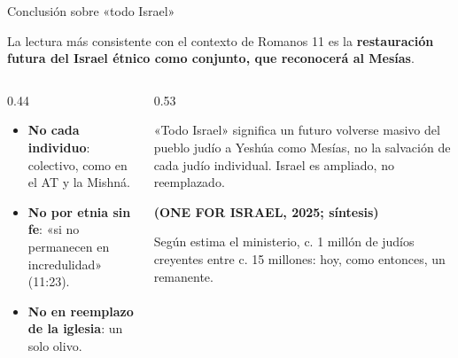 \documentclass[hyperref={bookmarks=false},aspectratio=169]{beamer}
\newcommand{\fuente}[1]{\par\hfill{\upshape\bfseries\footnotesize\textcolor{ladrillo}{#1}}}
\begin{document}
\begin{frame}{Conclusión sobre «todo Israel»}
\begin{tcolorbox}[colback=piedra,colframe=ladrillo,boxrule=1pt,arc=3pt,fontupper=\small]
La lectura más consistente con el contexto de Romanos 11 es la \textbf{restauración futura del Israel étnico como conjunto, que reconocerá al Mesías}.
\end{tcolorbox}
\begin{columns}[T,onlytextwidth]
\begin{column}{0.44\textwidth}\small
\begin{itemize}
\item \textbf{No cada individuo}: colectivo, como en el AT y la Mishná.
\item \textbf{No por etnia sin fe}: «si no permanecen en incredulidad» (11:23).
\item \textbf{No en reemplazo de la iglesia}: un solo olivo.
\end{itemize}
\end{column}
\begin{column}{0.53\textwidth}
\begin{cita}[fontupper=\scriptsize\itshape]«Todo Israel» significa un futuro volverse masivo del pueblo judío a Yeshúa como Mesías, no la salvación de cada judío individual. Israel es ampliado, no reemplazado.\fuente{(ONE FOR ISRAEL, 2025; síntesis)}\end{cita}
\scriptsize Según estima el ministerio, c. 1 millón de judíos creyentes entre c. 15 millones: hoy, como entonces, un remanente.
\end{column}
\end{columns}
\end{frame}
\end{document}
